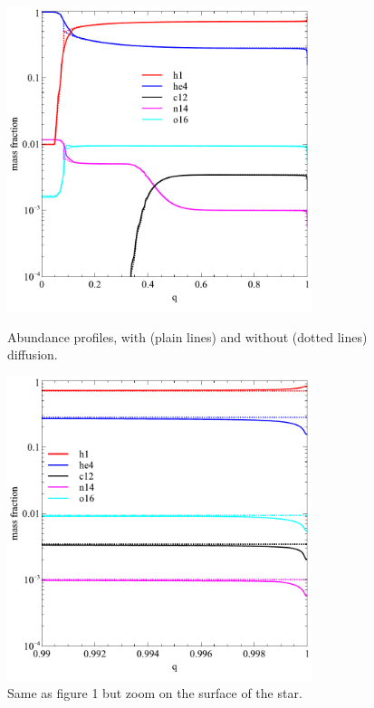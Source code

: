 \documentclass{article}
\begin{document}
	\begin{figure}[H]
                \begin{minipage}[t]{0.5\linewidth}
		       \centering
		       \includegraphics[width = 3.5in]{fig.pdf}
		       \caption{Abundance profiles, with (plain lines) and without (dotted lines) diffusion.}
		       \label{fig:1}
                \end{minipage}
                \hspace{0cm}
                \begin{minipage}[t]{0.5\linewidth}
                       \centering
                       \includegraphics[width = 3.5in]{figzoom.pdf}
                       \caption{Same as figure 1 but zoom on the surface of
                        the star.}
                       \label{fig:2}
                \end{minipage}
	\end{figure}


 
 
       
\end{document}
